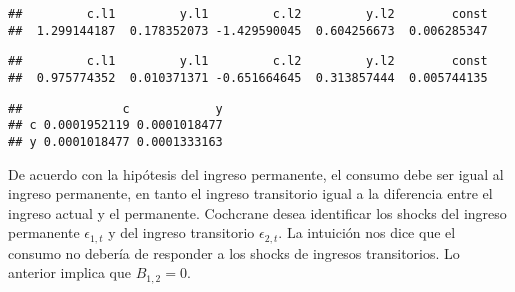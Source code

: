 \documentclass[
]{book}
\newenvironment{Shaded}{\begin{snugshade}}{\end{snugshade}}
\newcommand{\AttributeTok}[1]{\textcolor[rgb]{0.77,0.63,0.00}{#1}}
\newcommand{\DecValTok}[1]{\textcolor[rgb]{0.00,0.00,0.81}{#1}}
\newcommand{\FunctionTok}[1]{\textcolor[rgb]{0.00,0.00,0.00}{#1}}
\newcommand{\NormalTok}[1]{#1}
\newcommand{\OtherTok}[1]{\textcolor[rgb]{0.56,0.35,0.01}{#1}}
\newcommand{\SpecialCharTok}[1]{\textcolor[rgb]{0.00,0.00,0.00}{#1}}
\newcommand{\StringTok}[1]{\textcolor[rgb]{0.31,0.60,0.02}{#1}}
\begin{document}
\begin{Shaded}
\end{Shaded}

\begin{verbatim}
##         c.l1         y.l1         c.l2         y.l2        const 
##  1.299144187  0.178352073 -1.429590045  0.604256673  0.006285347
\end{verbatim}

\begin{Shaded}
\end{Shaded}

\begin{verbatim}
##         c.l1         y.l1         c.l2         y.l2        const 
##  0.975774352  0.010371371 -0.651664645  0.313857444  0.005744135
\end{verbatim}

\begin{Shaded}
\end{Shaded}

\begin{verbatim}
##              c            y
## c 0.0001952119 0.0001018477
## y 0.0001018477 0.0001333163
\end{verbatim}

De acuerdo con la hipótesis del ingreso permanente, el consumo debe ser igual al ingreso permanente, en tanto el ingreso transitorio igual a la diferencia entre el ingreso actual y el permanente. Cochcrane desea identificar los shocks del ingreso permanente \(\epsilon_{1,t}\) y del ingreso transitorio \(\epsilon_{2,t}\). La intuición nos dice que el consumo no debería de responder a los shocks de ingresos transitorios. Lo anterior implica que \(B_{1,2}=0\).
\end{document}
